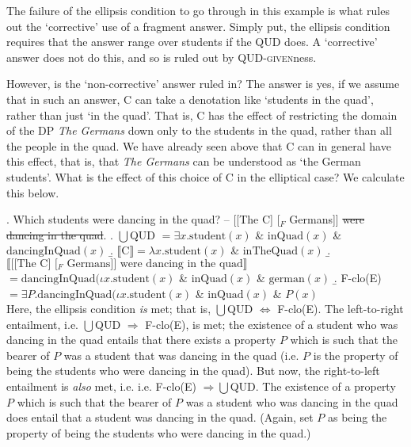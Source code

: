 \documentclass[doublespace]{umthesis}
\newcommand{\ext}[1]{\ensuremath{\llbracket \textrm{{#1}} \rrbracket}}
\newcommand{\pred}[1]{\ensuremath{\mathrm{{#1}}}}
\newcommand{\el}[1]{\sout{#1}}
\begin{document}
The failure of the ellipsis condition to go through in this example is what rules out the `corrective' use of a fragment answer.
Simply put, the ellipsis condition requires that the answer range over students if the QUD does.
A `corrective' answer does not do this, and so is ruled out by \textsc{QUD-given}ness.

However, is the `non-corrective' answer ruled in? The answer is yes, if we assume that in such an answer, C can take a denotation like `students in the quad', rather than just `in the quad'.
That is, C has the effect of restricting the domain of the DP {\it The Germans} down only to the students in the quad, rather than all the people in the quad.
We have already seen above that C can in general have this effect, that is, that {\it The Germans} can be understood as `the German students'.
What is the effect of this choice of C in the elliptical case?
We calculate this below.

\ex. 	Which students were dancing in the quad? -- [[The C] [$_F$ Germans]] \el{were dancing in the quad}.
	\a. $\bigcup$QUD $= \exists x. \pred{student}(x) $ \& $\pred{inQuad}(x)$ \&$ \pred{dancingInQuad}(x)$
	\b. $\ext{C} = \lambda x. \pred{student}(x) $ \& $\pred{inTheQuad}(x)$
	\b. \ext{[[The C] [$_F$ Germans]] were dancing in the quad} $= \pred{dancingInQuad}(\iota x. \pred{student}(x) $ \& $ \pred{inQuad}(x) $ \& $ \pred{german}(x)$
	\b. F-clo(E) $=\exists P. \pred{dancingInQuad}(\iota x. \pred{student}(x) $ \& $\pred{inQuad}(x) $ \& $ P(x)$\\

Here, the ellipsis condition \emph{is} met; that is, $\bigcup$QUD $ \Leftrightarrow$ F-clo(E).
The left-to-right entailment, i.e.  $\bigcup$QUD $\Rightarrow$ F-clo(E), is met; the existence of a student who was dancing in the quad entails that there exists a property $P$ which is such that the bearer of $P$ was a student that was dancing in the quad (i.e. $P$ is the property of being the students who were dancing in the quad).
But now, the right-to-left entailment is \emph{also} met, i.e. i.e. F-clo(E) $\Rightarrow \bigcup$QUD.
The existence of a property $P$ which is such that the bearer of $P$ was a student who was dancing in the quad does entail that a student was dancing in the quad.
(Again, set $P$ as being the property of being the students who were dancing in the quad.)
\end{document}
